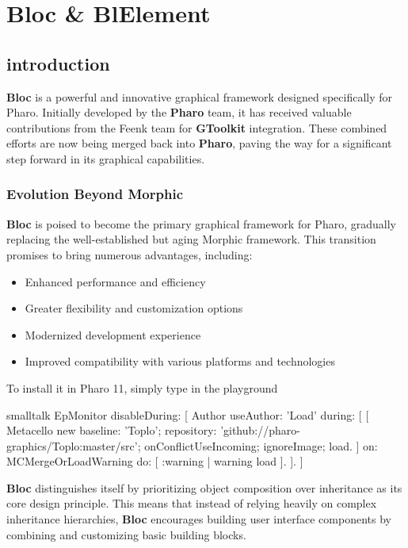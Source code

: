 \documentclass[10pt,twoside,english]{_support/latex/sbabook/sbabook}
\begin{document}
\part{Bloc \& BlElement}
\chapter{introduction}
\textbf{Bloc} is a powerful and innovative graphical framework designed specifically
for Pharo. Initially developed by the \textbf{Pharo} team, it has received valuable
contributions from the Feenk team for \textbf{GToolkit} integration. These combined
efforts are now being merged back into \textbf{Pharo}, paving the way for a
significant step forward in its graphical capabilities.

\section{Evolution Beyond Morphic}
\textbf{Bloc} is poised to become the primary graphical framework for Pharo,
gradually replacing the well-established but aging Morphic framework. This
transition promises to bring numerous advantages, including:

\begin{itemize}
    \item Enhanced performance and efficiency
    \item Greater flexibility and customization options
    \item Modernized development experience
    \item Improved compatibility with various platforms and technologies
\end{itemize}

To install it in Pharo 11, simply type in the playground
\begin{displaycode}{smalltalk}
EpMonitor disableDuring: [
  Author useAuthor: 'Load' during: [
    [ Metacello new baseline: 'Toplo'; repository: 'github://pharo-graphics/Toplo:master/src';
        onConflictUseIncoming;
        ignoreImage;
        load.
    ] on: MCMergeOrLoadWarning do: [ :warning | warning load ].
  ].
]
\end{displaycode}

\textbf{Bloc} distinguishes itself by prioritizing object composition over
inheritance as its core design principle. This means that instead of relying
heavily on complex inheritance hierarchies, \textbf{Bloc} encourages building user
interface components by combining and customizing basic building blocks.
\end{document}
